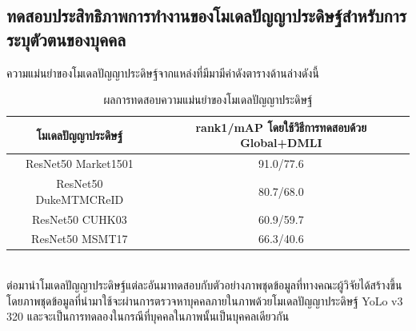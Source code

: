 \subsection{ทดสอบประสิทธิภาพการทำงานของโมเดลปัญญาประดิษฐ์สำหรับการระบุตัวตนของบุคคล}
ความแม่นยำของโมเดลปัญญาประดิษฐ์จากแหล่งที่มีมามีค่าดังตารางด้านล่างดังนี้
\begin{table}[!ht]
    \centering
    \begin{tabular}{|c|c|}
            \hline
            {โมเดลปัญญาประดิษฐ์}&{rank1/mAP โดยใช้วิธีการทดสอบด้วย Global+DMLI}				\\
            \hline
            ResNet50 Market1501	 			& 91.0/77.6								\\
            ResNet50 DukeMTMCReID			& 80.7/68.0								\\
            ResNet50 CUHK03				& 60.9/59.7								\\
            ResNet50 MSMT17				& 66.3/40.6								\\
        \hline
    \end{tabular}
    \caption{ผลการทดสอบความแม่นยำของโมเดลปัญญาประดิษฐ์}
    \label{tab: Accuracy of model ReID}
\end{table}
\\
ต่อมานำโมเดลปัญญาประดิษฐ์แต่ละอันมาทดสอบกับตัวอย่างภาพชุดข้อมูลที่ทางคณะผู้วิจัยได้สร้างขึ้น โดยภาพชุดข้อมูลที่นำมาใช้จะผ่านการตรวจหาบุคคลภายในภาพด้วยโมเดลปัญญาประดิษฐ์ YoLo v3 320 และจะเป็นการทดลองในกรณีที่บุคคลในภาพนั้นเป็นบุคคลเดียวกัน
